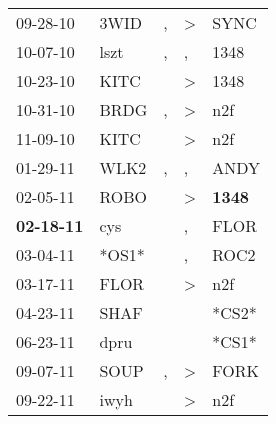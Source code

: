 \begin{supertabular}{p{0.07\textwidth}p{0.06\textwidth}p{0.02\textwidth}p{0.02\textwidth}p{0.06\textwidth}}
          09-28-10\textsuperscript{} &           3WID\textsuperscript{} &                , &     \textgreater &           SYNC\textsuperscript{} \\
          10-07-10\textsuperscript{} &           lszt\textsuperscript{} &                , &                , &           1348\textsuperscript{} \\
          10-23-10\textsuperscript{} &           KITC\textsuperscript{} &                  &     \textgreater &           1348\textsuperscript{} \\
          10-31-10\textsuperscript{} &           BRDG\textsuperscript{} &                , &     \textgreater &            n2f\textsuperscript{} \\
          11-09-10\textsuperscript{} &           KITC\textsuperscript{} &                  &     \textgreater &            n2f\textsuperscript{} \\
          01-29-11\textsuperscript{} &           WLK2\textsuperscript{} &                , &                , &           ANDY\textsuperscript{} \\
          02-05-11\textsuperscript{} &           ROBO\textsuperscript{} &                  &     \textgreater &  \textbf{1348\textsuperscript{}} \\
 \textbf{02-18-11\textsuperscript{}} &            cys\textsuperscript{} &                  &                , &           FLOR\textsuperscript{} \\
          03-04-11\textsuperscript{} &                            *OS1* &                  &                , &           ROC2\textsuperscript{} \\
          03-17-11\textsuperscript{} &           FLOR\textsuperscript{} &                  &     \textgreater &            n2f\textsuperscript{} \\
          04-23-11\textsuperscript{} &           SHAF\textsuperscript{} &                  &                  &                            *CS2* \\
          06-23-11\textsuperscript{} &           dpru\textsuperscript{} &                  &                  &                            *CS1* \\
          09-07-11\textsuperscript{} &           SOUP\textsuperscript{} &                , &     \textgreater &           FORK\textsuperscript{} \\
          09-22-11\textsuperscript{} &           iwyh\textsuperscript{} &                  &     \textgreater &            n2f\textsuperscript{} \\

\end{supertabular}
